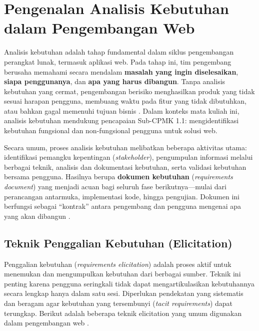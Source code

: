 ﻿\section{Pengenalan Analisis Kebutuhan dalam Pengembangan Web}

Analisis kebutuhan adalah tahap fundamental dalam siklus pengembangan perangkat lunak, termasuk aplikasi web. Pada tahap ini, tim pengembang berusaha memahami secara mendalam \textbf{masalah yang ingin diselesaikan}, \textbf{siapa penggunanya}, dan \textbf{apa yang harus dibangun}. Tanpa analisis kebutuhan yang cermat, pengembangan berisiko menghasilkan produk yang tidak sesuai harapan pengguna, membuang waktu pada fitur yang tidak dibutuhkan, atau bahkan gagal memenuhi tujuan bisnis \cite{mdnLearn}. Dalam konteks mata kuliah ini, analisis kebutuhan mendukung pencapaian Sub-CPMK 1.1: mengidentifikasi kebutuhan fungsional dan non-fungsional pengguna untuk solusi web.

Secara umum, proses analisis kebutuhan melibatkan beberapa aktivitas utama: identifikasi pemangku kepentingan (\textit{stakeholder}), pengumpulan informasi melalui berbagai teknik, analisis dan dokumentasi kebutuhan, serta validasi kebutuhan bersama pengguna. Hasilnya berupa \textbf{dokumen kebutuhan} (\textit{requirements document}) yang menjadi acuan bagi seluruh fase berikutnya---mulai dari perancangan antarmuka, implementasi kode, hingga pengujian. Dokumen ini berfungsi sebagai ``kontrak'' antara pengembang dan pengguna mengenai apa yang akan dibangun \cite{webdevLearn}.

\subsection{Teknik Penggalian Kebutuhan (Elicitation)}

Penggalian kebutuhan (\textit{requirements elicitation}) adalah proses aktif untuk menemukan dan mengumpulkan kebutuhan dari berbagai sumber. Teknik ini penting karena pengguna seringkali tidak dapat mengartikulasikan kebutuhannya secara lengkap hanya dalam satu sesi. Diperlukan pendekatan yang sistematis dan beragam agar kebutuhan yang tersembunyi (\textit{tacit requirements}) dapat terungkap. Berikut adalah beberapa teknik elicitation yang umum digunakan dalam pengembangan web \cite{mdnLearn}.

